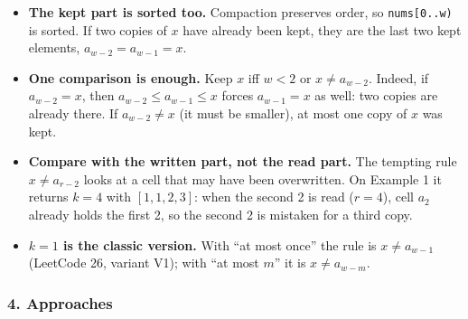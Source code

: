 \begin{itemize}[leftmargin=*]
    \item \textbf{The kept part is sorted too.} Compaction preserves order, so \texttt{nums[0..w)} is sorted. If two copies of $x$ have already been kept, they are the last two kept elements, $a_{w-2} = a_{w-1} = x$.
    \item \textbf{One comparison is enough.} Keep $x$ iff $w < 2$ or $x \ne a_{w-2}$. Indeed, if $a_{w-2} = x$, then $a_{w-2} \le a_{w-1} \le x$ forces $a_{w-1} = x$ as well: two copies are already there. If $a_{w-2} \ne x$ (it must be smaller), at most one copy of $x$ was kept.
    \item \textbf{Compare with the written part, not the read part.} The tempting rule $x \ne a_{r-2}$ looks at a cell that may have been overwritten. On Example 1 it returns $k = 4$ with $[1, 1, 2, 3]$: when the second 2 is read ($r = 4$), cell $a_2$ already holds the first 2, so the second 2 is mistaken for a third copy.
    \item \textbf{$k = 1$ is the classic version.} With ``at most once'' the rule is $x \ne a_{w-1}$ (LeetCode 26, variant V1); with ``at most $m$'' it is $x \ne a_{w-m}$.
\end{itemize}

\begin{diagrambox}
\end{diagrambox}

\subsubsection*{4. Approaches}

